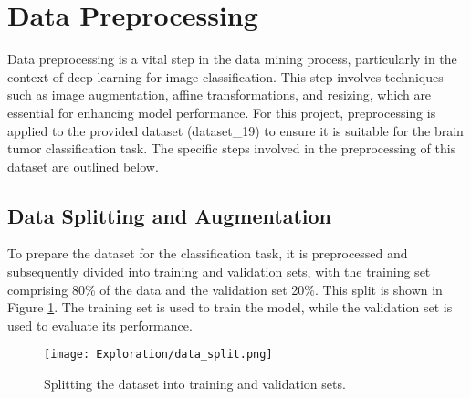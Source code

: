 \section{Data Preprocessing}\label{data_preprocessing}

Data preprocessing is a vital step in the data mining process, particularly in the context of deep learning for image classification. This step involves techniques such as image augmentation, affine transformations, and resizing, which are essential for enhancing model performance. For this project, preprocessing is applied to the provided dataset (dataset\_19) to ensure it is suitable for the brain tumor classification task. The specific steps involved in the preprocessing of this dataset are outlined below.

\subsection{Data Splitting and Augmentation}\label{data_split_augmentation}
To prepare the dataset for the classification task, it is preprocessed and subsequently divided into training and validation sets, with the training set comprising 80\% of the data and the validation set 20\%. This split is shown in Figure \ref{fig:data_split}. The training set is used to train the model, while the validation set is used to evaluate its performance.

\begin{figure}[H]
  \begin{center}
    \texttt{[image: Exploration/data\_split.png]}
  \end{center}
  \caption{Splitting the dataset into training and validation sets.}\label{fig:data_split}
\end{figure}



